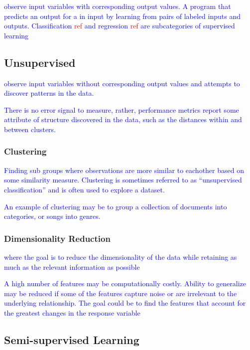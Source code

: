 \textcolor{blue}{observe input variables with corresponding output values. A program that predicts an output for a in input by learning from pairs of labeled inputs and outputs. Classification \textcolor{red}{ref} and regression \textcolor{red}{ref} are subcategories of supervised learning}

\subsection{Unsupervised}

\textcolor{blue}{observe input variables without corresponding output values and attempts to discover patterns in the data.}

\textcolor{blue}{There is no error signal to measure, rather, performance metrics report some attribute of structure discovered in the data, such as the distances within and between clusters.}
 
\subsubsection{Clustering}

\textcolor{blue}{Finding sub groups where observations are more similar to eachother based on some similarity measure. Clustering is sometimes referred to as ``unsupervised classification'' and is often used to explore a dataset.}

\textcolor{blue}{An example of clustering may be to group a collection of documents into categories, or songs into genres.}

\subsubsection{Dimensionality Reduction}

\textcolor{blue}{where the goal is to reduce the dimensionality of the data while retaining as much as the relevant information as possible}

\textcolor{blue}{A high number of features may be computationally costly. Ability to generalize may be reduced if some of the features capture noise or are irrelevant to the underlying relationship. The goal could be to find the features that account for the greatest changes in the response variable}


\subsection{Semi-supervised Learning}

